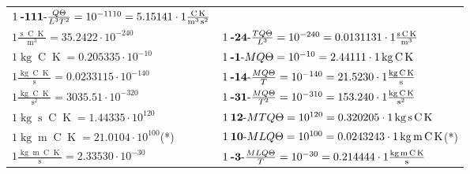 \begin{center}
\begin{longtable}{l l}
	{\color{black}$1\:\text{\textbf{-111}-} \frac{Q\Theta}{L^3T^2}=10^{-1110} = 5.15141 \cdot 1 \bm{\mathrm{ }}\frac{\operatorname{C}\operatorname{K}}{\operatorname{m}^3\operatorname{s}^2}$}\\
{\color{black}$1 \bm{\mathrm{ }}\frac{\operatorname{s}\operatorname{C}\operatorname{K}}{\operatorname{m}^3} = 35.2422\cdot10^{-240} $}&
	{\color{black}$1\:\text{\textbf{-24}-} \frac{TQ\Theta}{L^3}=10^{-240} = 0.0131131 \cdot 1 \bm{\mathrm{ }}\frac{\operatorname{s}\operatorname{C}\operatorname{K}}{\operatorname{m}^3}$}\\
\hline{\color{black}$1 \bm{\mathrm{ }}\operatorname{kg}\operatorname{C}\operatorname{K} = 0.205335\cdot10^{-10} $}&
	{\color{black}$1\:\text{\textbf{-1}-} MQ\Theta=10^{-10} = 2.44111 \cdot 1 \bm{\mathrm{ }}\operatorname{kg}\operatorname{C}\operatorname{K}$}\\
{\color{black}$1 \bm{\mathrm{ }}\frac{\operatorname{kg}\operatorname{C}\operatorname{K}}{\operatorname{s}} = 0.0233115\cdot10^{-140} $}&
	{\color{black}$1\:\text{\textbf{-14}-} \frac{MQ\Theta}{T}=10^{-140} = 21.5230 \cdot 1 \bm{\mathrm{ }}\frac{\operatorname{kg}\operatorname{C}\operatorname{K}}{\operatorname{s}}$}\\
{\color{black}$1 \bm{\mathrm{ }}\frac{\operatorname{kg}\operatorname{C}\operatorname{K}}{\operatorname{s}^2} = 3035.51\cdot10^{-320} $}&
	{\color{black}$1\:\text{\textbf{-31}-} \frac{MQ\Theta}{T^2}=10^{-310} = 153.240 \cdot 1 \bm{\mathrm{ }}\frac{\operatorname{kg}\operatorname{C}\operatorname{K}}{\operatorname{s}^2}$}\\
{\color{black}$1 \bm{\mathrm{ }}\operatorname{kg}\operatorname{s}\operatorname{C}\operatorname{K} = 1.44335\cdot10^{120} $}&
	{\color{black}$1\:\text{\textbf{12}-} MTQ\Theta=10^{120} = 0.320205 \cdot 1 \bm{\mathrm{ }}\operatorname{kg}\operatorname{s}\operatorname{C}\operatorname{K}$}\\
{\color{black}$1 \bm{\mathrm{ }}\operatorname{kg}\operatorname{m}\operatorname{C}\operatorname{K} = 21.0104\cdot10^{100} $}\quad(*)&
	{\color{black}$1\:\text{\textbf{10}-} MLQ\Theta=10^{100} = 0.0243243 \cdot 1 \bm{\mathrm{ }}\operatorname{kg}\operatorname{m}\operatorname{C}\operatorname{K}$}\quad(*)\\
{\color{black}$1 \bm{\mathrm{ }}\frac{\operatorname{kg}\operatorname{m}\operatorname{C}\operatorname{K}}{\operatorname{s}} = 2.33530\cdot10^{-30} $}&
	{\color{black}$1\:\text{\textbf{-3}-} \frac{MLQ\Theta}{T}=10^{-30} = 0.214444 \cdot 1 \bm{\mathrm{ }}\frac{\operatorname{kg}\operatorname{m}\operatorname{C}\operatorname{K}}{\operatorname{s}}$}\\

\end{longtable}
\end{center}
